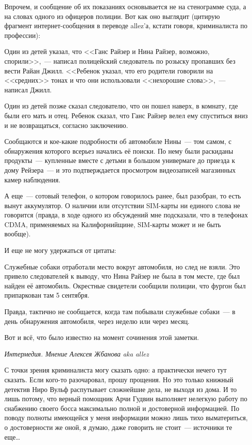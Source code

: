 Впрочем, и сообщение об их показаниях основывается не на стенограмме суда, а на словах одного из офицеров полиции. Вот как оно выглядит (цитирую фрагмент интернет-сообщения в переводе allez'а, кстати говоря, криминалиста по профессии): 


\begin{shadequote}{}
Один из детей указал, что <<Ганс Райзер и Нина Райзер, возможно, спорили>>,~--- написал полицейский следователь по розыску пропавших без вести Райан Джилл. <<Ребенок указал, что его родители говорили на <<средних>> тонах и что они использовали <<нехорошие слова>>,~--- написал Джилл.
\end{shadequote}

Один из детей позже сказал следователю, что он пошел наверх, в комнату, где были его мать и отец. Ребенок сказал, что Ганс Райзер велел ему спуститься вниз и не возвращаться, согласно заключению. 

Сообщаются и кое-какие подробности об автомобиле Нины~--- том самом, с обнаружения которого всерьез начались её поиски. По нему были раскиданы продукты~--- купленные вместе с детьми в большом универмаге до приезда к дому Рейзера~--- и это подтверждается просмотром видеозаписей магазинных камер наблюдения. 

А еще~--- сотовый телефон, о котором говорилось ранее, был разобран, то есть вынут аккумулятор. О наличии или отсутствии SIM-карты ни единого слова не говорится (правда, в ходе одного из обсуждений мне подсказали, что в телефонах CDMA, применяемых на Калифорнийщине, SIM-карты может и не быть вообще). 

И еще не могу удержаться от цитаты: 


\begin{shadequote}{}
Служебные собаки отработали место вокруг автомобиля, но след не взяли. Это привело следователей к выводу, что Нина Райзер не была в том месте, где был найден её автомобиль. Окрестные свидетели сообщили полиции, что фургон был припаркован там 5 сентября.
\end{shadequote}

Правда, тактично не сообщается, когда там побывали служебные собаки~--- в день обнаружения автомобиля, через неделю или через месяц. 

Вот и всё, что было известно на момент сочинения этой заметки. 


\textit{Интермедия. Мнение Алексея Жбанова aka allez}


С точки зрения криминалиста могу сказать одно: а практически нечего тут сказать. Если кого-то разочаровал, прошу прощения. Но это только книжный детектив Ниро Вульф распутывает сложнейшие дела, не выходя из дома. И то лишь потому, что верный помощник Арчи Гудвин выполняет нелегкую работу по снабжению своего босса максимально полной и достоверной информацией. По поводу полноты имеющейся у меня информации можно лишь тихо выматериться, о достоверности же оной, я думаю, даже говорить не стоит~--- источники те еще\dots 

